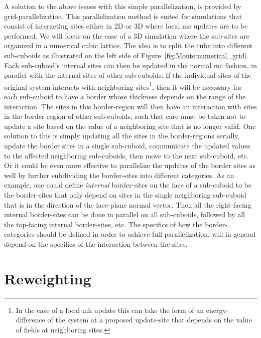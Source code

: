 A solution to the above issues with this simple parallelization, is provided by grid-parallelization. This parallelization method is suited for
simulations that consist of interacting sites either in $2$D or $3$D where local \ac{mc} updates are to be performed.
We will focus on the case of a $3$D simulation where the sub-sites
are organized in a numerical cubic lattice. The idea is to split the cube into different sub-cuboids as illustrated on the left side of
Figure~\ref{fig:Monte:numerical_grid}. Each sub-cuboid's internal sites can then
be updated in the normal \ac{mc} fashion, in parallel with the internal sites of other sub-cuboids. If the individual sites of the original
system interacts with neighboring sites\footnote{In the case of a local \ac{mh} update this can take the form of an energy-difference of
the system at a proposed update-site that depends on the value of fields at neighboring sites.}, then it will be necessary for each sub-cuboid to have
a border whose thickness depends on the range of the interaction. The sites in this border-region will then have an interaction with sites in
the border-region of other sub-cuboids, such that care must be taken not to update a site based on the value of a neighboring site that is no
longer valid. One solution to this is simply updating all the sites in the border-regions serially, \ie update the border sites in a single sub-cuboid,
communicate the updated values to the affected neighboring sub-cuboids, then move to the next sub-cuboid, etc. Or it could be even more effective
to parallelize the updates of the border sites as well by further subdividing the border-sites into different categories. As an example, one could
define \emph{internal} border-sites on the face of a sub-cuboid to be the border-sites that only depend on sites in the single neighboring sub-cuboid that
is in the direction of the face-plane normal vector. Then all the right-facing internal border-sites can be done in parallel on all sub-cuboids, followed
by all the top-facing internal border-sites, etc.
The specifics of how the border-categories should be defined in order to achieve full parallelization, will in general depend on the specifics
of the interaction between the sites.

\section{Reweighting}


